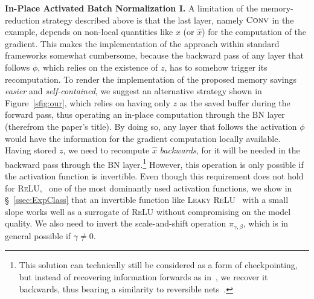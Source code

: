 \documentclass[10pt,twocolumn,letterpaper]{article}
\newcommand{\myparagraph}[1]{\vspace{5pt}\noindent\textbf{#1}}
\begin{document}
\myparagraph{In-Place Activated Batch Normalization I.}
A limitation of the memory-reduction strategy described above is that the last layer, namely $\textsc{Conv}$ in the example, depends on non-local quantities like $x$ (or $\hat x$) for the computation of the gradient. This makes the implementation of the approach within standard frameworks somewhat cumbersome, because the backward pass of any layer that follows $\phi$, which relies on the existence of $z$, has to somehow trigger its recomputation.
To render the implementation of the proposed memory savings \emph{easier} and \emph{self-contained}, we suggest an alternative strategy shown in Figure~\ref{sfig:our}, which relies on having only $z$ as the saved buffer during the forward pass, thus operating an in-place computation through the \textsc{BN} layer (therefrom the paper's title).
By doing so, any layer that follows the activation $\phi$ would have the information for the gradient computation locally available.
Having stored $z$, we need to recompute $\hat x$ \emph{backwards}, for it will be needed in the backward pass through the \textsc{BN} layer.\footnote{This solution can technically still be considered as a form of checkpointing, but instead of recovering information forwards as in~\cite{Martens2012,Chen+16}, we recover it backwards, thus bearing a similarity to reversible nets~\cite{Gomez2017}.}
However, this operation is only possible if the activation function is invertible. Even though this requirement does not hold for \textsc{ReLU}, \ie~one of the most dominantly used activation functions, we show in \S~\ref{ssec:ExpClass} that an invertible function like \textsc{Leaky ReLU}~\cite{MaaHanNg13} with a small slope works well as a surrogate of \textsc{ReLU} without compromising on the model quality.
We also need to invert the scale-and-shift operation $\pi_{\gamma,\beta}$, which is in general possible if $\gamma\neq 0$. 
\end{document}
